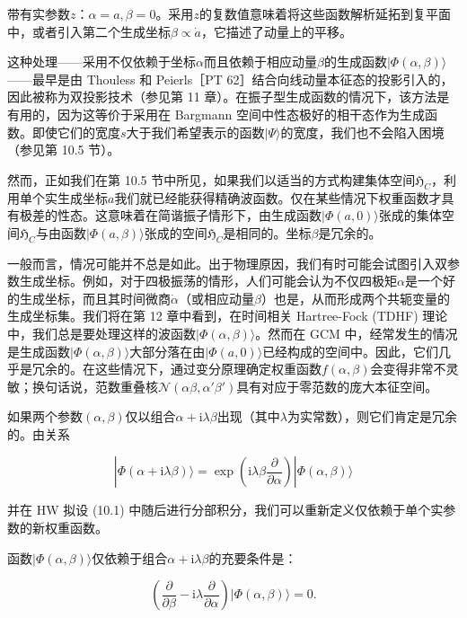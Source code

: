 带有实参数$z$：$\alpha=a,\beta=0$。采用$z$的复数值意味着将这些函数解析延拓到复平面中，或者引入第二个生成坐标$\beta\propto\dot{a}$，它描述了动量上的平移。

这种处理——采用不仅依赖于坐标$\alpha$而且依赖于相应动量$\beta$的生成函数$|\Phi(\alpha,\beta)\rangle$——最早是由
Thouless 和 Peierls［PT 62］结合向线动量本征态的投影引入的，因此被称为双投影技术（参见第 11 章）。在振子型生成函数的情况下，该方法是有用的，因为这等价于采用在
Bargmann 空间中性态极好的相干态作为生成函数。即使它们的宽度$s$大于我们希望表示的函数$|\Psi\rangle$的宽度，我们也不会陷入困境（参见第
10.5 节）。

然而，正如我们在第 10.5 节中所见，如果我们以适当的方式构建集体空间$\mathfrak{H}_{C}$，利用单个实生成坐标$a$我们就已经能获得精确波函数。仅在某些情况下权重函数才具有极差的性态。这意味着在简谐振子情形下，由生成函数$|\Phi(a,0)\rangle$张成的集体空间$\mathfrak{H}_{C}$与由函数$|\Phi(a,\beta)\rangle$张成的空间$\mathfrak{H}_{C}$是相同的。坐标$\beta$是冗余的。

一般而言，情况可能并不总是如此。出于物理原因，我们有时可能会试图引入双参数生成坐标。例如，对于四极振荡的情形，人们可能会认为不仅四极矩$\alpha$是一个好的生成坐标，而且其时间微商$\dot{\alpha}$（或相应动量$\beta$）也是，从而形成两个共轭变量的生成坐标集。我们将在第
12 章中看到，在时间相关 Hartree-Fock (TDHF) 理论中，我们总是要处理这样的波函数$|\Phi(\alpha,\beta)\rangle$。然而在
GCM 中，经常发生的情况是生成函数$|\Phi(\alpha,\beta)\rangle$大部分落在由$|\Phi(a,0)\rangle$已经构成的空间中。因此，它们几乎是冗余的。在这些情况下，通过变分原理确定权重函数$f(\alpha,\beta)$会变得非常不灵敏；换句话说，范数重叠核$\mathscr{N}(\alpha\beta,\alpha'\beta')$具有对应于零范数的庞大本征空间。

如果两个参数$(\alpha,\beta)$仅以组合$\alpha+\mathrm{i}\lambda\beta$出现（其中$\lambda$为实常数），则它们肯定是冗余的。由关系

\[
|\Phi(\alpha+\mathrm{i}\lambda\beta)\rangle=\exp\left(\mathrm{i}\lambda\beta\frac{\partial}{\partial\alpha}\right)|\Phi(\alpha,\beta)\rangle
\]

并在 HW 拟设 (10.1) 中随后进行分部积分，我们可以重新定义仅依赖于单个实参数的新权重函数。

函数$|\Phi(\alpha,\beta)\rangle$仅依赖于组合$\alpha+\mathrm{i}\lambda\beta$的充要条件是：

\begin{equation}
\left(\frac{\partial}{\partial\beta}-\mathrm{i}\lambda\frac{\partial}{\partial\alpha}\right)|\Phi(\alpha,\beta)\rangle=0.\label{eq:10.90}
\end{equation}

